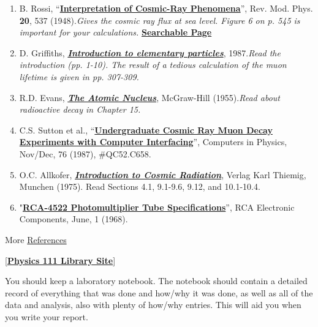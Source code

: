 \documentclass{../lab}
\begin{document}
\begin{enumerate}
    \item B. Rossi, ``\href{http://rmp.aps.org/abstract/RMP/v20/i3/p537\_1}{\textbf{Interpretation of Cosmic-Ray Phenomena}}'', Rev. Mod. Phys. \textbf{20}, 537 (1948).\emph{Gives the cosmic ray flux at sea level. Figure 6 on p. 545 is important for your calculations.} \href{http://physics111.lib.berkeley.edu/Physics111/Reprints/MUO/02-Cosmic-Ray\_Phenomena.pdf}{\textbf{Searchable Page}}

    \item D. Griffiths, \emph{\href{http://physics111.lib.berkeley.edu/Physics111/Reprints/MUO/04-Introduction\_to\_Elementary\_Particles.pdf}{\textbf{Introduction to elementary particles}}}, 1987.\emph{Read the introduction (pp. 1-10). The result of a tedious calculation of the muon lifetime is given in pp. 307-309.}

    \item R.D. Evans, \emph{\href{http://physics111.lib.berkeley.edu/Physics111/Reprints/MUO/05-The\_Atomic\_Nucleus.pdf}{\textbf{The Atomic Nucleus}}}, McGraw-Hill (1955).\emph{Read about radioactive decay in Chapter 15.}

    \item C.S. Sutton et al., ``\href{http://physics111.lib.berkeley.edu/Physics111/Reprints/MUO/01-Undergraduate\_Cosmic\_Ray\_Muon\_Decay.pdf}{\textbf{Undergraduate Cosmic Ray Muon Decay Experiments with Computer Interfacing}}'', Computers in Physics, Nov/Dec, 76 (1987), \#QC52.C658.

    \item O.C. Allkofer, \emph{\href{http://physics111.lib.berkeley.edu/Physics111/Reprints/MUO/06-Introduction\_to\_Cosmic\_Radiation.pdf}{\textbf{Introduction to Cosmic Radiation}}}, Verlag Karl Thiemig, Munchen (1975). Read Sections 4.1, 9.1-9.6, 9.12, and 10.1-10.4.

    \item "\href{http://physics111.lib.berkeley.edu/Physics111/Equipment\_Manuals/RCA\_PMT.pdf}{\textbf{RCA-4522 Photomultiplier Tube Specifications}}”, RCA Electronic Components, June, 1 (1968).
\end{enumerate}

More \hyperref[sec:References]{References}

[\href{http://physics111.lib.berkeley.edu/Physics111/Reprints/MUO/MUO\_index.html}{\textbf{Physics 111 Library Site}}]

You should keep a laboratory notebook. The notebook should contain a detailed record of everything that was done and how/why it was done, as well as all of the data and analysis, also with plenty of how/why entries. This will aid you when you write your report.
\end{document}
